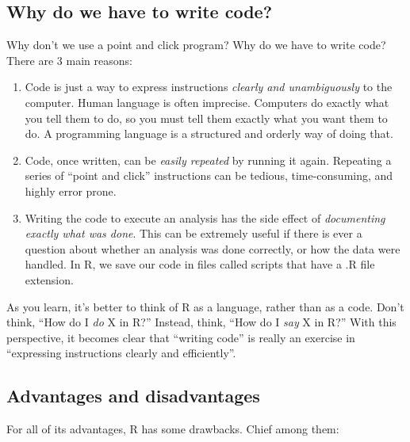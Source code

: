 \documentclass[
  13,
  letterpaper,
]{report}
\begin{document}
\subsection{Why do we have to write code?}\label{sec-r-faq-code}

Why don't we use a point and click program? Why do we have to write
code? There are 3 main reasons:

\begin{enumerate}
\def\labelenumi{\arabic{enumi}.}
\item
  Code is just a way to express instructions \emph{clearly and
  unambiguously} to the computer. Human language is often imprecise.
  Computers do exactly what you tell them to do, so you must tell them
  exactly what you want them to do. A programming language is a
  structured and orderly way of doing that.
\item
  Code, once written, can be \emph{easily repeated} by running it again.
  Repeating a series of ``point and click'' instructions can be tedious,
  time-consuming, and highly error prone.
\item
  Writing the code to execute an analysis has the side effect of
  \emph{documenting exactly what was done}. This can be extremely useful
  if there is ever a question about whether an analysis was done
  correctly, or how the data were handled. In R, we save our code in
  files called scripts that have a .R file extension.
\end{enumerate}

As you learn, it's better to think of R as a language, rather than as a
code. Don't think, ``How do I \emph{do} X in R?'' Instead, think, ``How
do I \emph{say} X in R?'' With this perspective, it becomes clear that
``writing code'' is really an exercise in ``expressing instructions
clearly and efficiently''.

\subsection{Advantages and disadvantages}\label{sec-r-faq-advdis}

For all of its advantages, R has some drawbacks. Chief among them:
\end{document}
